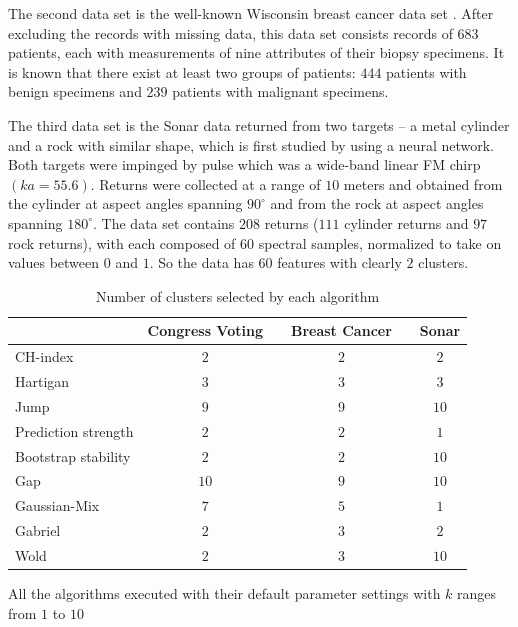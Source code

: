 \documentclass[11pt]{article}
\begin{document}
The second data set is the well-known Wisconsin breast cancer data set \citep{mangasarian1990pattern}. After excluding the records with missing data, this data set consists records of $683$ patients, each with measurements of nine attributes of their biopsy specimens. It is known that there exist at least two groups of patients: $444$ patients with benign specimens and $239$ patients with malignant specimens.

The third data set is the Sonar data returned from two targets -- a metal
cylinder and a rock with similar shape, which is first studied by
\cite{gorman1988analysis} using a neural network. Both targets were impinged
by pulse which was a wide-band linear FM chirp $(ka = 55.6)$. Returns were
collected at a range of $10$ meters and obtained from the cylinder at aspect
angles spanning $90^{\circ}$ and from the rock at aspect angles spanning
$180^{\circ}$. The data set contains $208$ returns ($111$ cylinder returns and
$97$ rock returns), with each composed of $60$ spectral samples, normalized to
take on values between $0$ and $1$. So the data has $60$ features with clearly
$2$ clusters. 


\begin{table}[H]
\begin{center}
\captionsetup{justification=centering}
\caption{\label{table2} Number of clusters selected by each algorithm}
\begin{tabular}{lccccc}
    \hline                  
 & Congress Voting && Breast Cancer && Sonar \\ \hline                    
CH-index & $2$ && $2$  && $2$    \\
Hartigan & $3$ && $3$  &&  $3$   \\
Jump & $9$ && $9$ && $10$  \\   
Prediction strength & $2$ &&  $2$ && $1$    \\
Bootstrap stability & $2$ &&  $2$ &&  $10$   \\ 
Gap & $10$ && $9$ && $10$  \\   
Gaussian-Mix & $7$ && $5$ && $1$  \\   
Gabriel & $2$  && $3$  && $2$  \\    
Wold & $2$ && $3$ && $10$ \\  \hline 
\end{tabular}
\end{center}
\hspace{0.5in} \footnotesize {All the algorithms executed with their default parameter settings with $k$ ranges from $1$ to $10$}
\end{table} 
\end{document}
